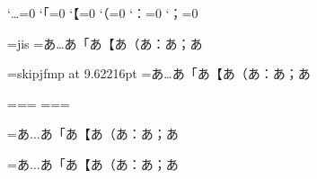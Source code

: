 \prebreakpenalty`…=0
\postbreakpenalty`「=0
\postbreakpenalty`【=0
\postbreakpenalty`（=0
\postbreakpenalty`：=0
\postbreakpenalty`；=0


\font\x=jis\x
{}=\hbox{あ…あ「あ【あ（あ：あ；あ}

\font\y=skipjfmp at 9.62216pt\y
{}=\hbox{あ…あ「あ【あ（あ：あ；あ}

\newfam\mx
\newfam\my
\textfont\mx=\x \scriptfont\mx=\x \scriptscriptfont\mx=\x
\textfont\my=\y \scriptfont\my=\y \scriptscriptfont\my=\y

\jfam\mx
{}=\hbox{$あ…あ「あ【あ（あ：あ；あ$}

\jfam\my
{}=\hbox{$あ…あ「あ【あ（あ：あ；あ$}

\bye

